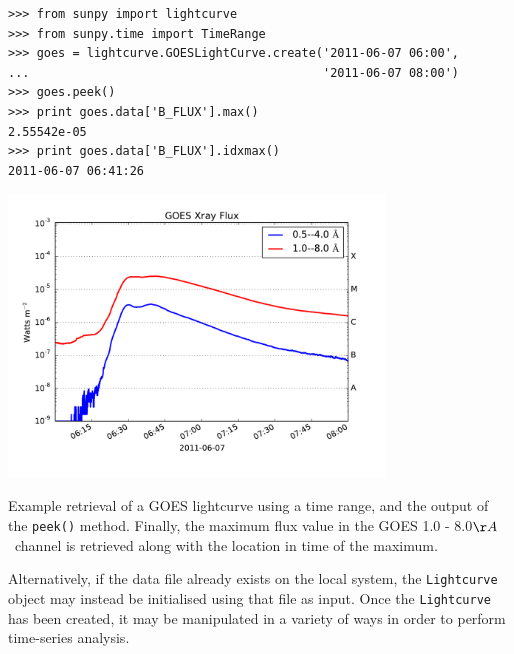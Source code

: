 \begin{listing}[H]
\begin{verbatim}
>>> from sunpy import lightcurve
>>> from sunpy.time import TimeRange
>>> goes = lightcurve.GOESLightCurve.create('2011-06-07 06:00',
...                                         '2011-06-07 08:00')
>>> goes.peek()
>>> print goes.data['B_FLUX'].max()
2.55542e-05
>>> print goes.data['B_FLUX'].idxmax()
2011-06-07 06:41:26
\end{verbatim}
\begin{center}
\includegraphics[width=10cm]{goes_lightcurve.pdf}
\end{center}
\caption{Example retrieval of a GOES lightcurve
using a time range, and the output of the 
\texttt{peek()} method. Finally, the maximum flux value in the GOES 1.0 - 8.0$\AA$\ channel is retrieved along with the location in time of the maximum.}
\label{code:goes_lc}
\end{listing}

Alternatively, if the data file already exists on the local system, the 
\texttt{Lightcurve} object may instead be initialised using that file as input.
Once the \texttt{Lightcurve} has been created, it may be manipulated in 
a variety of ways in order to perform time-series analysis.

